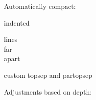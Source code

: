 \documentclass{article}
\begin{document}
Automatically compact:

\begin{pseudo}[left-margin=\parindent]
indented
\end{pseudo}

\begin{pseudo}[line-height=2]
lines \\
far \\
apart
\end{pseudo}

\begin{pseudo}[topsep=1cm, partopsep=1cm]
custom topsep and partopsep
\end{pseudo}

Adjustments based on depth:

\bigskip
\end{document}
